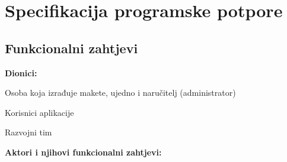 \chapter{Specifikacija programske potpore}
		
	\section{Funkcionalni zahtjevi}
			
			
			\noindent \textbf{Dionici:}
			
			\begin{packed_enum}
				
				\item Osoba koja izrađuje makete, ujedno i naručitelj (administrator)
				\item Korisnici aplikacije		
				\item Razvojni tim
				
			\end{packed_enum}
			
			\noindent \textbf{Aktori i njihovi funkcionalni zahtjevi:}
			
